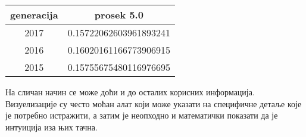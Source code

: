 \begin{tabular}{c|c}
generacija & prosek 5.0 \\ \hline
2017 & 0.15722062603961893241 \\
2016 & 0.16020161166773906915 \\
2015 & 0.15755675480116976695 \\
\end{tabular}

На сличан начин се може доћи и до осталих корисних информација. Визуелизације су често моћан алат који може указати на специфичне детаље које је потребно истражити, а затим је неопходно и математички показати да је интуиција иза њих тачна.